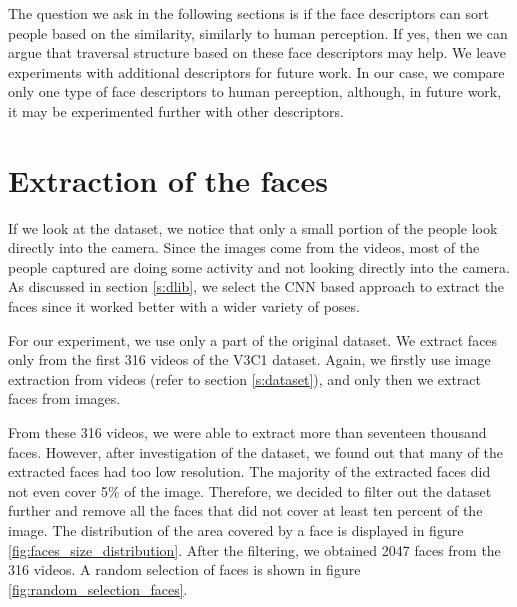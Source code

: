 
The question we ask in the following sections is if the face descriptors can sort people based on the similarity, similarly to human perception. If yes, then we can argue that traversal structure based on these face descriptors may help. We leave experiments with additional descriptors for future work. In our case, we compare only one type of face descriptors to human perception, although, in future work, it may be experimented further with other descriptors.


\section{Extraction of the faces}

If we look at the dataset, we notice that only a small portion of the people look directly into the camera. Since the images come from the videos, most of the people captured are doing some activity and not looking directly into the camera. As discussed in section \ref{s:dlib}, we select the CNN based approach to extract the faces since it worked better with a wider variety of poses.

For our experiment, we use only a part of the original dataset. We extract faces only from the first 316 videos of the V3C1 dataset. Again, we firstly use image extraction from videos (refer to section \ref{s:dataset}), and only then we extract faces from images. 

From these 316 videos, we were able to extract more than seventeen thousand faces. However, after investigation of the dataset, we found out that many of the extracted faces had too low resolution. The majority of the extracted faces did not even cover 5\% of the image. Therefore, we decided to filter out the dataset further and remove all the faces that did not cover at least ten percent of the image. The distribution of the area covered by a face is displayed in figure \ref{fig:faces_size_distribution}. After the filtering,  we obtained 2047 faces from the 316 videos. A random selection of faces is shown in figure \ref{fig:random_selection_faces}. 

